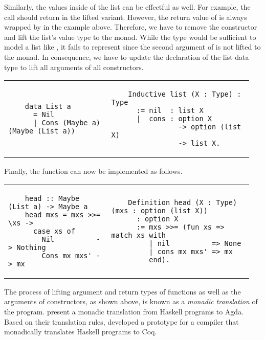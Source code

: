 Similarly, the values inside of the list can be effectful as well.
For example, the call  should return  in the lifted variant.
However, the return value of  is always wrapped by  in the example above.
Therefore, we have to remove the  constructor and lift the list's value type to the  monad.
While the type  would be sufficient to model a list like \haskell{[1, undefined, 2]}, it fails to represent  since the second argument of \haskell{(:)} is not lifted to the  monad.
In consequence, we have to update the declaration of the list data type to lift all arguments of all constructors.

\begin{tabular}{p{0.40\linewidth} | p{0.55\linewidth}}
  \begin{verbatim}
    data List a
      = Nil
      | Cons (Maybe a) (Maybe (List a))
  \end{verbatim}
  &
  \begin{verbatim}
    Inductive list (X : Type) : Type
      := nil  : list X
      |  cons : option X
                -> option (list X)
                -> list X.
  \end{verbatim}
\end{tabular}

Finally, the  function can now be implemented as follows.

\begin{tabular}{p{0.40\linewidth} | p{0.55\linewidth}}
  \begin{verbatim}
    head :: Maybe (List a) -> Maybe a
    head mxs = mxs >>= \xs ->
      case xs of
        Nil          -> Nothing
        Cons mx mxs' -> mx
  \end{verbatim}
  &
  \begin{verbatim}
    Definition head (X : Type) (mxs : option (list X))
      : option X
      := mxs >>= (fun xs => match xs with
         | nil          => None
         | cons mx mxs' => mx
         end).
  \end{verbatim}
\end{tabular}

The process of lifting argument and return types of functions as well as the arguments of constructors, as shown above, is known as a \textit{monadic translation} of the program.
\cite{Abel:2005} present a monadic translation from Haskell programs to Agda.
Based on their translation rules, \cite{Jessen:2019} developed a prototype for a compiler that monadically translates Haskell programs to Coq.

